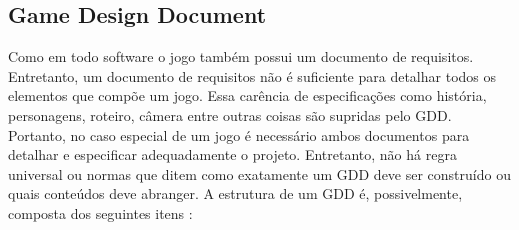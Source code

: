 \documentclass[12pt, 
openright, 
oneside, 
a4paper,    
brazil]{facom-ufu-abntex2}
\begin{document}
\subsection{Game Design Document}
Como em todo software o jogo também possui um documento de requisitos. Entretanto, um documento de requisitos não é suficiente para detalhar todos os elementos que compõe um jogo.  Essa carência de especificações como história, personagens, roteiro, câmera entre outras coisas são supridas pelo GDD.  Portanto, no caso especial de um jogo é necessário ambos documentos para detalhar e especificar adequadamente o projeto. Entretanto, não há regra universal ou normas que ditem como exatamente um GDD deve ser construído ou quais conteúdos deve abranger. A estrutura de um GDD é, possivelmente, composta dos seguintes itens \cite{LevelUp}:
\end{document}
